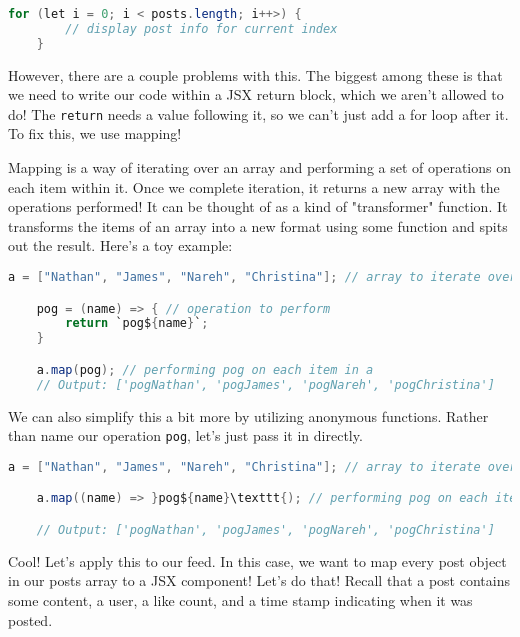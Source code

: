 \begin{lstlisting}[language=Java]
    for (let i = 0; i < posts.length; i++>) {
        // display post info for current index
    }
\end{lstlisting}

However, there are a couple problems with this. The biggest among these is that we need to write our code within a JSX return block, which we aren't allowed to do! The \texttt{return} needs a value following it, so we can't just add a for loop after it. To fix this, we use mapping!

Mapping is a way of iterating over an array and performing a set of operations on each item within it. Once we complete iteration, it returns a new array with the operations performed! It can be thought of as a kind of "transformer" function. It transforms the items of an array into a new format using some function and spits out the result. Here's a toy example:

\begin{lstlisting}[language=Java]
    a = ["Nathan", "James", "Nareh", "Christina"]; // array to iterate over

    pog = (name) => { // operation to perform
        return `pog${name}`;
    }

    a.map(pog); // performing pog on each item in a
    // Output: ['pogNathan', 'pogJames', 'pogNareh', 'pogChristina']
\end{lstlisting}

We can also simplify this a bit more by utilizing anonymous functions. Rather than name our operation \texttt{pog}, let's just pass it in directly.

\begin{lstlisting}[language=Java]
    a = ["Nathan", "James", "Nareh", "Christina"]; // array to iterate over

    a.map((name) => }pog${name}\texttt{); // performing pog on each item in a

    // Output: ['pogNathan', 'pogJames', 'pogNareh', 'pogChristina']
\end{lstlisting}

Cool! Let's apply this to our feed. In this case, we want to map every post object in our posts array to a JSX component! Let's do that! Recall that a post contains some content, a user, a like count, and a time stamp indicating when it was posted. 

